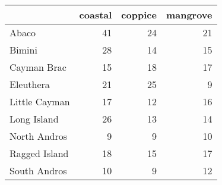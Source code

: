 
\begin{tabular}{lrrr}
\toprule
  & coastal & coppice & mangrove\\
\midrule
Abaco & 41 & 24 & 21\\
Bimini & 28 & 14 & 15\\
Cayman Brac & 15 & 18 & 17\\
Eleuthera & 21 & 25 & 9\\
Little Cayman & 17 & 12 & 16\\
Long Island & 26 & 13 & 14\\
North Andros & 9 & 9 & 10\\
Ragged Island & 18 & 15 & 17\\
South Andros & 10 & 9 & 12\\
\bottomrule
\end{tabular}